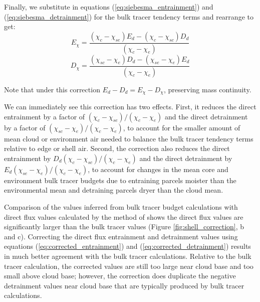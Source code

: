 \documentclass[draft,grl]{agutex}
\begin{document}
\begin{article}
Finally, we substitute in equations (\ref{eq:siebesma_entrainment}) and 
(\ref{eq:siebesma_detrainment}) for the bulk tracer tendency terms and 
rearrange to get:
\begin{equation}
  \label{eq:corrected_entrainment}
    E_{\chi} = \frac{(\chi_{c} - \chi_{se})E_d - (\chi_{c} - \chi_{sc})D_d}
             {(\chi_{c} - \chi_{e})}
\end{equation}
\begin{equation}
  \label{eq:corrected_detrainment}
    D_{\chi} = \frac{(\chi_{sc} - \chi_{e})D_d - (\chi_{se} - \chi_{e})E_d}
             {(\chi_{c} - \chi_{e})}
\end{equation}

Note that under this correction $E_d-D_d = E_{\chi}-D_{\chi}$, preserving 
mass continuity.

We can immediately see this correction has two effects.  First, it reduces
the direct entrainment by a factor of
$(\chi_{c} - \chi_{se})/(\chi_{c} - \chi_{e})$ and the direct detrainment 
by a factor of $(\chi_{sc} - \chi_{e})/(\chi_{c} - \chi_{e})$, to account for 
the smaller amount of mean cloud or environment air needed to balance the 
bulk tracer tendency terms relative to edge or shell air.  Second, the 
correction also reduces the direct entrainment by 
$D_d(\chi_{c} - \chi_{sc})/(\chi_{c} - \chi_{e})$ and the direct detrainment 
by $E_d(\chi_{se} - \chi_{e})/(\chi_{c} - \chi_{e})$, to account for changes 
in the mean core and environment bulk tracer budgets due to entraining 
parcels moister than the environmental mean and detraining parcels dryer than 
the cloud mean.  

Comparison of the values inferred from bulk tracer budget calculations with 
direct flux values calculated by the method of \cite{Romps2010} shows the 
direct flux values are significantly larger than the bulk tracer values 
(Figure \ref{fig:shell_correction}, b and c).  Correcting the direct flux 
entrainment and detrainment values using equations 
(\ref{eq:corrected_entrainment}) and (\ref{eq:corrected_detrainment}) results 
in much better agreement with the bulk tracer calculations.  Relative to the 
bulk tracer calculation, the corrected values are still too large near cloud 
base and too small above cloud base; however, the correction does duplicate the 
negative detrainment values near cloud base that are typically produced by bulk 
tracer calculations.



\end{article}
\end{document}
